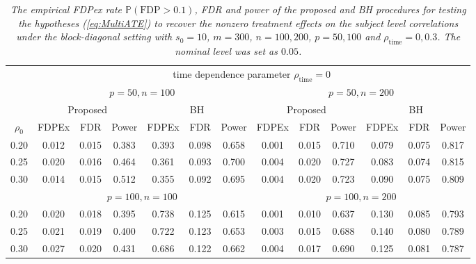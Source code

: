 \documentclass[12pt]{article}
\theoremstyle{definition}
\begin{document}
\iffalse
\begin{table}[!htb]
\scriptsize
\begin{center}
\caption{\textit{The empirical FDPex rate $\mathbb{P}(\mbox{FDP} > 0.1)$, FDR and power of the proposed and BH procedures for testing the hypotheses (\ref{eq:MultiATE}) to recover the nonzero treatment effects on the subject level correlations under the block-diagonal  setting with $s_0 = 10$, $m = 300$, $n = 100, 200$, $p = 50, 100$ and $\rho_{\mathrm{\scriptstyle time}} = 0, 0.3$. The nominal level was set as $0.05$.
}} \medskip
\label{simulation1}
\begin{tabular}{c|ccc|ccc|ccc|ccc}
\hline\hline
 & \multicolumn{12}{c}{time dependence parameter $\rho_{\mathrm{\scriptstyle time}} = 0$} 
\\ \cline{2-13} 
 & \multicolumn{6}{c|}{$p = 50, n = 100$} & \multicolumn{6}{c}{$p = 50, n = 200$}
\\ \cline{2-13} 
 & \multicolumn{3}{c|}{Proposed} & \multicolumn{3}{c|}{BH} & \multicolumn{3}{c|}{Proposed} & \multicolumn{3}{c}{BH} 
\\ \cline{2-13} 
$\rho_0$ & FDPEx & FDR & Power & FDPEx & FDR & Power & FDPEx & FDR & Power & FDPEx & FDR & Power 
\\ \hline
0.20 &0.012&0.015&0.383&0.393&0.098&0.658 &0.001&0.015&0.710&0.079&0.075&0.817
\\ \cline{2-13}
0.25 &0.020&0.016&0.464&0.361&0.093&0.700 &0.004&0.020&0.727&0.083&0.074&0.815
\\ \cline{2-13}
0.30 &0.014&0.015&0.512&0.355&0.092&0.695 &0.004&0.020&0.723&0.090&0.075&0.809
\\ \hline
 & \multicolumn{6}{c|}{$p = 100, n = 100$} & \multicolumn{6}{c}{$p = 100, n = 200$}
\\ \hline
0.20 &0.020&0.018&0.395&0.738&0.125&0.615 &0.001&0.010&0.637&0.130&0.085&0.793
\\ \cline{2-13}
0.25 &0.021&0.019&0.400&0.722&0.123&0.653 &0.003&0.015&0.688&0.140&0.080&0.789
\\ \cline{2-13}
0.30 &0.027&0.020&0.431&0.686&0.122&0.662 &0.004&0.017&0.690&0.125&0.081&0.787
\\ \hline\hline


\end{tabular}
\end{center}
\end{table}
\end{document}
